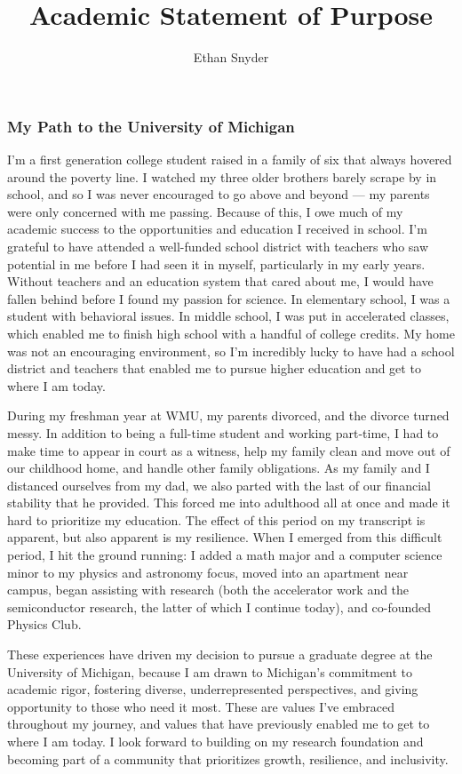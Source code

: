 \documentclass[11pt]{article}
\title{\vspace{-5em}Academic Statement of Purpose\\
	\large \dept{}}
\author{Ethan Snyder}
\date{}
\newcommand{\school}{University of Michigan}
\begin{document}
\maketitle
\subsubsection*{My Path to the \school{}}
I'm a first generation college student raised in a family of six that always hovered around the poverty line. I watched my three older brothers barely scrape by in school, and so I was never encouraged to go above and beyond --- my parents were only concerned with me passing. Because of this, I owe much of my academic success to the opportunities and education I received in school. I'm grateful to have attended a well-funded school district with teachers who saw potential in me before I had seen it in myself, particularly in my early years. Without teachers and an education system that cared about me, I would have fallen behind before I found my passion for science. In elementary school, I was a student with behavioral issues. In middle school, I was put in accelerated classes, which enabled me to finish high school with a handful of college credits. My home was not an encouraging environment, so I'm incredibly lucky to have had a school district and teachers that enabled me to pursue higher education and get to where I am today.

During my freshman year at WMU, my parents divorced, and the divorce turned messy. In addition to being a full-time student and working part-time, I had to make time to appear in court as a witness, help my family clean and move out of our childhood home, and handle other family obligations. As my family and I distanced ourselves from my dad, we also parted with the last of our financial stability that he provided. This forced me into adulthood all at once and made it hard to prioritize my education. The effect of this period on my transcript is apparent, but also apparent is my resilience. When I emerged from this difficult period, I hit the ground running: I added a math major and a computer science minor to my physics and astronomy focus, moved into an apartment near campus, began assisting with research (both the accelerator work and the semiconductor research, the latter of which I continue today), and co-founded Physics Club.

These experiences have driven my decision to pursue a graduate degree at the University of Michigan, because I am drawn to Michigan's commitment to academic rigor, fostering diverse, underrepresented perspectives, and giving opportunity to those who need it most. These are values I've embraced throughout my journey, and values that have previously enabled me to get to where I am today. I look forward to building on my research foundation and becoming part of a community that prioritizes growth, resilience, and inclusivity.
\end{document}
